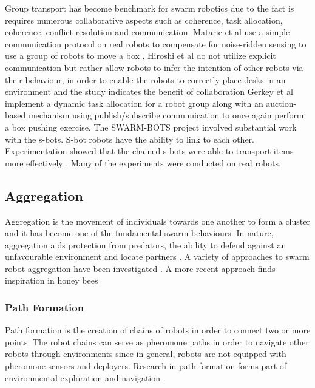Group transport has become benchmark for swarm robotics due to the fact is requires numerous collaborative aspects such as coherence, task allocation, coherence, conflict resolution and communication. Mataric et al use a simple communication protocol on real robots to compensate for noise-ridden sensing to use a group of robots to move a box \cite{mataric1995cooperative}. Hiroshi et al do not utilize explicit communication but rather allow robots to infer the intention of other robots via their behaviour, in order to enable the robots to correctly place desks in an environment and the study indicates the benefit of collaboration \cite{sugie1995placing}
Gerkey et al implement a dynamic task allocation for a robot group along with an auction-based mechanism using publish/subscribe communication to once again perform a box pushing exercise. \cite{gerkey2002sold}
The SWARM-BOTS project involved substantial work with the s-bots. S-bot robots have the ability to link to each other. Experimentation showed that the chained s-bots were able to transport items more effectively \cite{gross2004group, dorigo2005swarm}. Many of the experiments were conducted on real robots. 

\subsection{Aggregation}
Aggregation is the movement of individuals towards one another to form a cluster and it has become one of the fundamental swarm behaviours. In nature, aggregation aids protection from predators, the ability to defend against an unfavourable environment and locate partners \cite{bonabeau2001self}. A variety of approaches to swarm robot aggregation have been investigated \cite{yan2011algorithm, soysal2007aggregation, trianni2003evolving, dimarogonas2008connectedness }. A more recent approach finds inspiration in honey bees \cite{schmickl2011beeclust, schmickl2009two}

\subsubsection{Path Formation}
Path formation is the creation of chains of robots in order to connect two or more points. The robot chains can serve as pheromone paths in order to navigate other robots through environments since in general, robots are not equipped with pheromone sensors and deployers. Research in path formation forms part of environmental exploration and navigation \cite{nouyan2006chain}.

